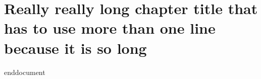 \chapter{Really really long chapter title that has to use more than one line because it is so long}
\lipsum[100]
\lipsum[101]

\lipsum[102]

\begin{notebox}
    \lipsum[21]
\end{notebox}

\lipsum[104]


\amzindex

\ifx\allfiles\undefined
	
	
	
	end{document}
	\else
	\fi